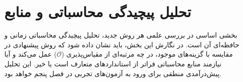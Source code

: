 \begin{algorithm}[!ht]
\caption{روند محاسباتی و مراحل بهینه‌سازی روش پیشنهادی}\label{algo:chap4_training}
\begin{algorithmic}[1]
\vspace{0.15cm}
\vspace{0.25cm}
\vspace{0.15cm}
    \EndIf{}
\EndWhile{}
\vspace{0.15cm}
\vspace{0.15cm}
\end{algorithmic}
\end{algorithm}


\section{تحلیل پیچیدگی محاسباتی و منابع}\label{sec:4-4}

بخشی اساسی در بررسی علمی هر روش جدید، تحلیل پیچیدگی محاسباتی زمانی و حافظه‌ای آن است. در نگارش این بخش، باید نشان داده شود که روش پیشنهادی در مقایسه با گزینه‌های موجود، در چه مرتبه‌ای از مقیاس‌پذیری ($\mathcal{O}$) عمل می‌کند و آیا نیازمند منابع محاسباتی فراتر از استانداردهای متعارف است یا خیر. این تحلیل پیش‌درآمدی منطقی برای ورود به آزمون‌های تجربی در فصل پنجم خواهد بود.
